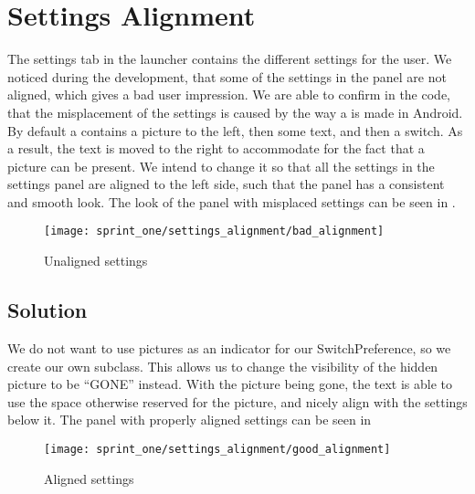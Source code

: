 \section{Settings Alignment}
\label{sec:settings_alignment}

The settings tab in the launcher contains the different settings for the user. We noticed during the development, that some of the settings in the panel are not aligned, which gives a bad user impression. We are able to confirm in the code, that the misplacement of the settings is caused by the way a  is made in Android. By default a  contains a picture to the left, then some text, and then a switch. As a result, the text is moved to the right to accommodate for the fact that a picture can be present. We intend to change it so that all the settings in the settings panel are aligned to the left side, such that the panel has a consistent and smooth look. The look of the panel with misplaced settings can be seen in .

\begin{figure}[!htbp]
    \centering
    \texttt{[image: sprint\_one/settings\_alignment/bad\_alignment]}
    \caption{Unaligned settings}
    \label{fig:settings_alignment_bad}
\end{figure}

\subsection{Solution} 
\label{sub:settings_alignment_solution}
We do not want to use pictures as an indicator for our SwitchPreference, so we create our own  subclass. This allows us to change the visibility of the hidden picture to be ``GONE'' instead. With the picture being gone, the text is able to use the space otherwise reserved for the picture, and nicely align with the settings below it. The panel with properly aligned settings can be seen in 

\begin{figure}[!htbp]
    \centering
    \texttt{[image: sprint\_one/settings\_alignment/good\_alignment]}
    \caption{Aligned settings}
    \label{fig:settings_alignment_good}
\end{figure}